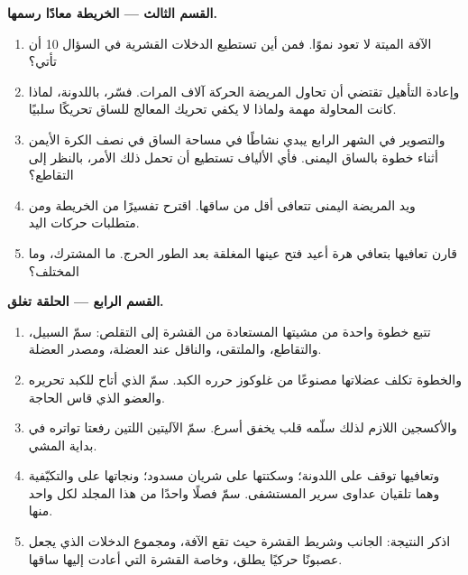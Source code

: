 \begin{problem}
\medskip
\noindent\textbf{القسم الثالث --- الخريطة معادًا رسمها.}
\begin{enumerate}[resume]
  \item {} الآفة الميتة لا تعود نموًا. فمن أين تستطيع الدخلات
        القشرية في السؤال 10 أن تأتي؟
  \item وإعادة التأهيل تقتضي أن تحاول المريضة الحركة آلاف المرات. فسّر،
        باللدونة، لماذا كانت المحاولة مهمة ولماذا لا يكفي تحريك المعالج
        للساق تحريكًا سلبيًا.
  \item والتصوير في الشهر الرابع يبدي نشاطًا في مساحة الساق في نصف
        الكرة الأيمن أثناء خطوة بالساق اليمنى. فأي الألياف تستطيع أن
        تحمل ذلك الأمر، بالنظر إلى التقاطع؟
  \item ويد المريضة اليمنى تتعافى أقل من ساقها. اقترح تفسيرًا من
        الخريطة ومن متطلبات حركات اليد.
  \item قارن تعافيها بتعافي هرة أعيد فتح عينها المغلقة بعد الطور
        الحرج. ما المشترك، وما المختلف؟
\end{enumerate}

\medskip
\noindent\textbf{القسم الرابع --- الحلقة تغلق.}
\begin{enumerate}[resume]
  \item تتبع خطوة واحدة من مشيتها المستعادة من القشرة إلى التقلص: سمّ
        السبيل، والتقاطع، والملتقى، والناقل عند العضلة، ومصدر 
        العضلة.
  \item والخطوة تكلف عضلاتها  مصنوعًا من غلوكوز حرره الكبد. سمّ
         الذي أتاح للكبد تحريره والعضو الذي قاس الحاجة.
  \item والأكسجين اللازم لذلك  سلّمه قلب يخفق أسرع. سمّ الآليتين
        اللتين رفعتا تواتره في بداية المشي.
  \item وتعافيها توقف على اللدونة؛ وسكتتها على شريان مسدود؛ ونجاتها على
         والتكيّفية وهما تلقيان عداوى سرير المستشفى. سمّ
        فصلًا واحدًا من هذا المجلد لكل واحد منها.
  \item اذكر النتيجة: الجانب وشريط القشرة حيث تقع الآفة، ومجموع
        الدخلات الذي يجعل عصبونًا حركيًا يطلق، وخاصة القشرة التي أعادت
        إليها ساقها.
\end{enumerate}
\end{problem}
